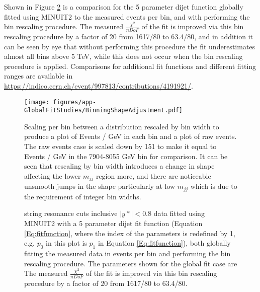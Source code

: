 Shown in Figure \ref{fig:5ParamGlobalFitBinRescaleComparison} is a comparison for the 5 parameter dijet function globally fitted using MINUIT2 to the measured events per bin, and with performing the bin rescaling procedure. The measured $\frac{\chi^{2}}{nDoF}$ of the fit is improved via this bin rescaling procedure by a factor of 20 from 1617/80 to 63.4/80, and in addition it can be seen by eye that without performing this procedure the fit underestimates almost all bins above 5 TeV, while this does not occur when the bin rescaling procedure is applied. Comparisons for additional fit functions and different fitting ranges are available in {\href{https://indico.cern.ch/event/997813/contributions/4191921/attachments/2178521/3679266/dijet_CompareBinRescale_26_01_2021.pdf}{https://indico.cern.ch/event/997813/contributions/4191921/}}.


\begin{figure}
    \centering
    \texttt{[image: figures/app-GlobalFitStudies/BinningShapeAdjustment.pdf]}
    \caption{Scaling per bin between a distribution rescaled by bin width to produce a plot of Events / GeV in each bin and a plot of raw events. The raw events case is scaled down by 151 to make it equal to Events / GeV in the 7904-8055 GeV bin for comparison. It can be seen that rescaling by bin width introduces a change in shape affecting the lower $m_{jj}$ region more, and there are noticeable unsmooth jumps in the shape particularly at low $m_{jj}$ which is due to the requirement of integer bin widths.}
    \label{fig:BinningShapeAdjustment}
\end{figure}



\begin{figure}[!htb]
  \centering
  \caption{string resonance cuts inclusive $|y*|<0.8$ data fitted using MINUIT2 with a 5 parameter dijet fit function (Equation \ref{Eq:fitfunction}, where the index of the parameters is redefined by 1, e.g. $p_{0}$ in this plot is $p_{1}$ in Equation \ref{Eq:fitfunction}), both globally fitting the measured data in events per bin and performing the bin rescaling procedure. The parameters shown for the global fit case are  The measured $\frac{\chi^{2}}{nDoF}$ of the fit is improved via this bin rescaling procedure by a factor of 20 from 1617/80 to 63.4/80.}
  \label{fig:5ParamGlobalFitBinRescaleComparison}
\end{figure}

